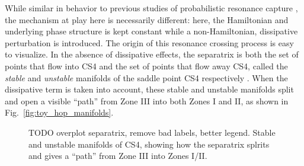 \documentclass[
        fleqn,
        usenatbib,
    ]{mnras}
\begin{document}
While similar in behavior to previous studies of probabilistic resonance capture
\citep{henrard1982, su2020}, the mechanism at play here is necessarily
different: here, the Hamiltonian and underlying phase structure is kept constant
while a non-Hamiltonian, dissipative perturbation is introduced. The origin of
this resonance crossing process is easy to visualize. In the absence of
dissipative effects, the separatrix is both the set of points that flow into CS4
and the set of points that flow away CS4, called the \emph{stable} and
\emph{unstable} manifolds of the saddle point CS4 respectively \citep{g_and_h}.
When the dissipative term is taken into account, these stable and unstable
manifolds split and open a visible ``path'' from Zone III into both Zones I and
II, as shown in Fig.~\ref{fig:toy_hop_manifolds}.
\begin{figure}
    \centering
    \caption{TODO overplot separatrix, remove bad labels, better legend. Stable
    and unstable manifolds of CS4, showing how the separatrix splrits and gives
    a ``path'' from Zone III into Zones I/II.}\label{fig:}
\end{figure}
\end{document}
